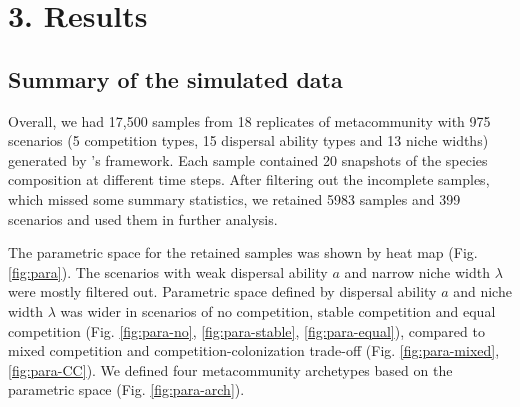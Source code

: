 \chapter*{3. Results}
\setcounter{chapter}{3}
\section{Summary of the simulated data}
\noindent
Overall, we had 17,500 samples from 18 replicates of metacommunity with 975 scenarios (5 competition types, 15 dispersal ability types and 13 niche widths) generated by \citeauthor{thompson2020process}'s framework. Each sample contained 20 snapshots of the species composition at different time steps. After filtering out the incomplete samples, which missed some summary statistics, we retained 5983 samples and 399 scenarios and used them in further analysis.

The parametric space for the retained samples was shown by heat map (Fig. \ref{fig:para}). The scenarios with weak dispersal ability $a$ and narrow niche width $\lambda$ were mostly filtered out. Parametric space defined by dispersal ability $a$ and niche width $\lambda$ was wider in scenarios of no competition, stable competition and equal competition (Fig. \ref{fig:para-no}, \ref{fig:para-stable}, \ref{fig:para-equal}), compared to mixed competition and competition-colonization trade-off (Fig. \ref{fig:para-mixed}, \ref{fig:para-CC}). We defined four metacommunity archetypes based on the parametric space (Fig. \ref{fig:para-arch}).

